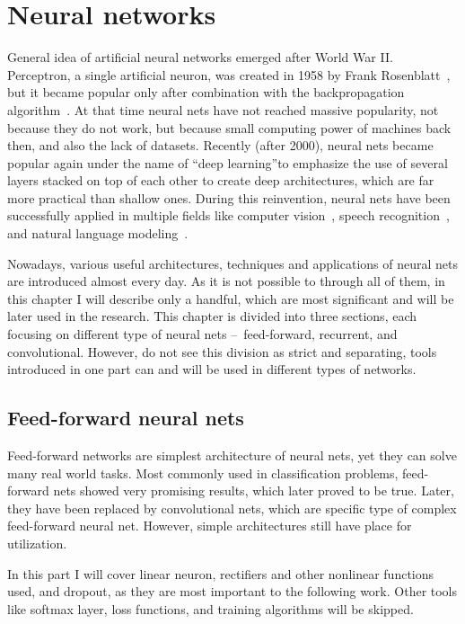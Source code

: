 \chapter{Neural networks} \label{chp:nn}

General idea of artificial neural networks emerged after World War II. Perceptron, a single artificial neuron, was created in 1958 by Frank Rosenblatt~\cite{rosenblatt58a}, but it became popular only after combination with the backpropagation algorithm~\cite{bryson1975applied,werbos1974beyond}. At that time neural nets have not reached massive popularity, not because they do not work, but because small computing power of machines back then, and also the lack of datasets. Recently (after 2000), neural nets became popular again under the name of \textquotedblleft deep learning\textquotedblright to emphasize the use of several layers stacked on top of each other to create deep architectures, which are far more practical than shallow ones. During this reinvention, neural nets have been successfully applied in multiple fields like computer vision~\cite{DBLP:journals/corr/HeZRS15}, speech recognition~\cite{DBLP:journals/corr/abs-1303-5778}, and natural language modeling~\cite{DBLP:conf/interspeech/MikolovKBCK10}.

Nowadays, various useful architectures, techniques and applications of neural nets are introduced almost every day. As it is not possible to through all of them, in this chapter I will describe only a handful, which are most significant and will be later used in the research. This chapter is divided into three sections, each focusing on different type of neural nets --~feed-forward, recurrent, and convolutional. However, do not see this division as strict and separating, tools introduced in one part can and will be used in different types of networks.

\section{Feed-forward neural nets}

Feed-forward networks are simplest architecture of neural nets, yet they can solve many real world tasks. Most commonly used in classification problems, feed-forward nets showed very promising results, which later proved to be true. Later, they have been replaced by convolutional nets, which are specific type of complex feed-forward neural net. However, simple architectures still have place for utilization.

In this part I will cover linear neuron, rectifiers and other nonlinear functions used, and dropout, as they are most important to the following work. Other tools like softmax layer, loss functions, and training algorithms will be skipped. %

